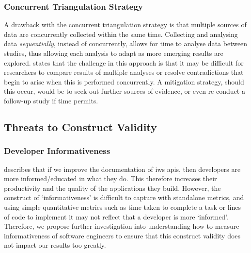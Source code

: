 \subsubsection{Concurrent Triangulation Strategy}

A drawback with the concurrent triangulation strategy is that multiple sources of data are concurrently collected within the same time. Collecting and analysing data \textit{sequentially}, instead of concurrently, allows for time to analyse data between studies, thus allowing each analysis to adapt as more emerging results are explored. \citet{Easterbrook:2007ws} states that the challenge in this approach is that it may be difficult for researchers to compare results of multiple analyses or resolve contradictions that begin to arise when this is performed concurrently. A mitigation strategy, should this occur, would be to seek out further sources of evidence, or even re-conduct a follow-up study if time permits.

\subsection{Threats to Construct Validity}

\subsubsection{Developer Informativeness}

 describes that if we improve the documentation of \gls{iws} \glspl{api}, then developers are more informed/educated in what they do. This therefore increases their productivity and the quality of the applications they build. However, the construct of `informativeness' is difficult to capture with standalone metrics, and using simple quantitative metrics such as time taken to complete a task or lines of code to implement it may not reflect that a developer is more `informed'. Therefore, we propose further investigation into understanding how to measure informativeness of software engineers to ensure that this construct validity does not impact our results too greatly.



